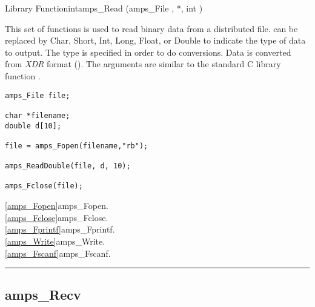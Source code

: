 \begin{deftypefn}{Library Function}{int}{amps\_Read}
(amps_File ,  *, int )

\DESCRIPTION

This set of functions is used to read binary data from a distributed file.
  can be replaced by Char, Short, Int, Long, Float, or Double
to indicate the type of data to output.  The type is specified in order
to do conversions.  Data is converted from {\em XDR} format (\cite{xdr.87}).
The arguments are similar to the standard C library function
.

\EXAMPLE
\begin{display}\begin{verbatim}
amps_File file;

char *filename;
double d[10];

file = amps_Fopen(filename,"rb");

amps_ReadDouble(file, d, 10);

amps_Fclose(file);
\end{verbatim}\end{display}

\SEEALSO
\vref{amps_Fopen}{amps\_Fopen}. \\
\vref{amps_Fclose}{amps\_Fclose}. \\
\vref{amps_Fprintf}{amps\_Fprintf}. \\
\vref{amps_Write}{amps\_Write}. \\
\vref{amps_Fscanf}{amps\_Fscanf}. \\

\end{deftypefn}



\noindent\rule{\textwidth}{1mm}

\subsection{amps\_Recv}
\label{amps_Recv}


